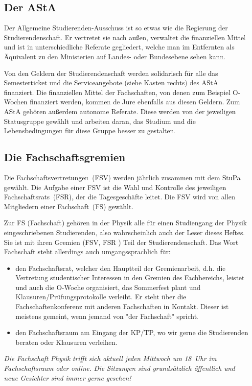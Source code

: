 \begin{multicols*}{2}
\subsection{Der AStA}
Der Allgemeine Studierenden-Ausschuss ist so etwas wie die Regierung der Studierendenschaft. Er vertretet sie nach außen, verwaltet die finanziellen Mittel und ist in unterschiedliche Referate gegliedert, welche man im Entfernten als Äquivalent zu den Ministerien auf Landes- oder Bundesebene sehen kann.

Von den Geldern der Studierendenschaft werden solidarisch für alle das Semesterticket und die Serviceangebote (siehe Kasten rechts) des AStA finanziert. Die finanziellen Mittel der Fachschaften, von denen zum Beispiel O-Wochen finanziert werden, kommen de Jure ebenfalls aus diesen Geldern. Zum AStA gehören außerdem autonome Referate. Diese werden von der jeweiligen Statusgruppe gewählt und arbeiten daran, das Studium und die Lebensbedingungen für diese Gruppe besser zu gestalten.


\subsection{Die Fachschaftsgremien}
Die Fachschaftsvertretungen~(FSV) werden jährlich zusammen mit dem StuPa gewählt.
Die Aufgabe einer FSV ist die Wahl und Kontrolle des jeweiligen Fachschaftsrats~(FSR), der die Tagesgeschäfte leitet.
Die FSV wird von allen Mitgliedern einer Fachschaft~(FS) gewählt.


Zur FS (Fachschaft) gehören in der Physik alle für einen Studiengang der Physik eingeschriebenen Studierenden, also wahrscheinlich auch der Leser dieses Heftes. Sie ist mit ihren Gremien (FSV, FSR ) Teil der Studierendenschaft. 
Das Wort Fachschaft steht allerdings auch umgangssprachlich für:
\begin{itemize}
	\item den Fachschaftsrat, welcher den Hauptteil der Gremienarbeit, d.h. die Vertretung studentischer Interessen in den Gremien des Fachbereichs, leistet und auch die O-Woche organisiert, das Sommerfest plant und Klausuren/Prüfungsprotokolle verleiht. Er steht über die Fachschaftenkonferenz mit anderen Fachschaften in Kontakt.
Dieser ist meistens gemeint, wenn jemand von "der Fachschaft" spricht.
	\item den Fachschaftsraum am Eingang der KP/TP, wo wir gerne die Studierenden beraten oder Klausuren verleihen.
\end{itemize}
\emph{Die Fachschaft Physik trifft sich aktuell jeden Mittwoch um 18~Uhr im Fachschaftsraum oder online.
Die Sitzungen sind grundsätzlich öffentlich und neue Gesichter sind immer gerne gesehen!}



\end{multicols*}
